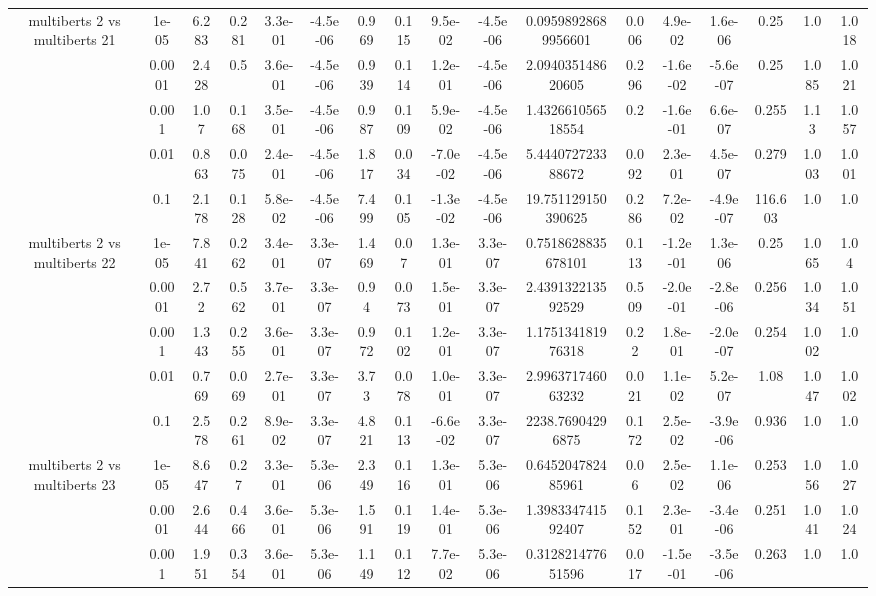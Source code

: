\begin{tabular}{|c|c|c|c|c|c|c|c|c|c|c|c|c|c|c|c|c|}
\hline
\multirow{5}{*}{multiberts 2 vs multiberts 21} & 1e-05 & 6.283 & 0.281 & 3.3e-01 & -4.5e-06 & 0.969 & 0.115 & 9.5e-02 & -4.5e-06 & 0.09598928689956601 & 0.006 & 4.9e-02 & 1.6e-06 & 0.25 & 1.0 & 1.018 \\
 & 0.0001 & 2.428 & 0.5 & 3.6e-01 & -4.5e-06 & 0.939 & 0.114 & 1.2e-01 & -4.5e-06 & 2.094035148620605 & 0.296 & -1.6e-02 & -5.6e-07 & 0.25 & 1.085 & 1.021 \\
 & 0.001 & 1.07 & 0.168 & 3.5e-01 & -4.5e-06 & 0.987 & 0.109 & 5.9e-02 & -4.5e-06 & 1.432661056518554 & 0.2 & -1.6e-01 & 6.6e-07 & 0.255 & 1.13 & 1.057 \\
 & 0.01 & 0.863 & 0.075 & 2.4e-01 & -4.5e-06 & 1.817 & 0.034 & -7.0e-02 & -4.5e-06 & 5.444072723388672 & 0.092 & 2.3e-01 & 4.5e-07 & 0.279 & 1.003 & 1.001 \\
 & 0.1 & 2.178 & 0.128 & 5.8e-02 & -4.5e-06 & 7.499 & 0.105 & -1.3e-02 & -4.5e-06 & 19.751129150390625 & 0.286 & 7.2e-02 & -4.9e-07 & 116.603 & 1.0 & 1.0 \\
\hline
\multirow{5}{*}{multiberts 2 vs multiberts 22} & 1e-05 & 7.841 & 0.262 & 3.4e-01 & 3.3e-07 & 1.469 & 0.07 & 1.3e-01 & 3.3e-07 & 0.7518628835678101 & 0.113 & -1.2e-01 & 1.3e-06 & 0.25 & 1.065 & 1.04 \\
 & 0.0001 & 2.72 & 0.562 & 3.7e-01 & 3.3e-07 & 0.94 & 0.073 & 1.5e-01 & 3.3e-07 & 2.439132213592529 & 0.509 & -2.0e-01 & -2.8e-06 & 0.256 & 1.034 & 1.051 \\
 & 0.001 & 1.343 & 0.255 & 3.6e-01 & 3.3e-07 & 0.972 & 0.102 & 1.2e-01 & 3.3e-07 & 1.175134181976318 & 0.22 & 1.8e-01 & -2.0e-07 & 0.254 & 1.002 & 1.0 \\
 & 0.01 & 0.769 & 0.069 & 2.7e-01 & 3.3e-07 & 3.73 & 0.078 & 1.0e-01 & 3.3e-07 & 2.996371746063232 & 0.021 & 1.1e-02 & 5.2e-07 & 1.08 & 1.047 & 1.002 \\
 & 0.1 & 2.578 & 0.261 & 8.9e-02 & 3.3e-07 & 4.821 & 0.113 & -6.6e-02 & 3.3e-07 & 2238.76904296875 & 0.172 & 2.5e-02 & -3.9e-06 & 0.936 & 1.0 & 1.0 \\
\hline
\multirow{5}{*}{multiberts 2 vs multiberts 23} & 1e-05 & 8.647 & 0.27 & 3.3e-01 & 5.3e-06 & 2.349 & 0.116 & 1.3e-01 & 5.3e-06 & 0.645204782485961 & 0.06 & 2.5e-02 & 1.1e-06 & 0.253 & 1.056 & 1.027 \\
 & 0.0001 & 2.644 & 0.466 & 3.6e-01 & 5.3e-06 & 1.591 & 0.119 & 1.4e-01 & 5.3e-06 & 1.398334741592407 & 0.152 & 2.3e-01 & -3.4e-06 & 0.251 & 1.041 & 1.024 \\
 & 0.001 & 1.951 & 0.354 & 3.6e-01 & 5.3e-06 & 1.149 & 0.112 & 7.7e-02 & 5.3e-06 & 0.312821477651596 & 0.017 & -1.5e-01 & -3.5e-06 & 0.263 & 1.0 & 1.0 \\

\end{tabular}

